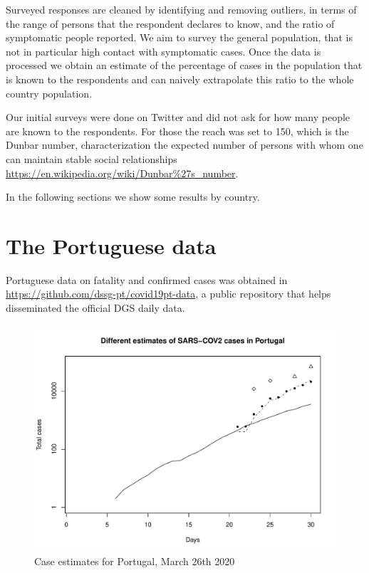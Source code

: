 \documentclass{article}
\begin{document}
Surveyed responses are cleaned by identifying and removing outliers, in terms of the range of persons that the respondent declares to know, and the ratio of symptomatic people reported. We aim to survey the general population, that is not in particular high contact with symptomatic cases. Once the data is processed we obtain an estimate of the percentage of cases in the population that is known to the respondents and can naively extrapolate this ratio to the whole country population. 


Our initial surveys were done on Twitter and did not ask for how many people are known to the respondents. For those the reach was set to 150, which is the Dunbar number, characterization the expected number of persons with whom one can maintain stable social relationships \url{https://en.wikipedia.org/wiki/Dunbar%27s_number}. 

In the following sections we show some results by country. 

\section{The Portuguese data}

Portuguese data on fatality and confirmed cases was obtained in \url{https://github.com/dssg-pt/covid19pt-data}, a public repository that helps disseminated the official DGS daily data.

\begin{figure}
\begin{center}
\includegraphics[width=.9\linewidth]{EstPTMar26.pdf}
\end{center}
\caption{Case estimates for Portugal, March 26th 2020}
\end{figure}
\end{document}
